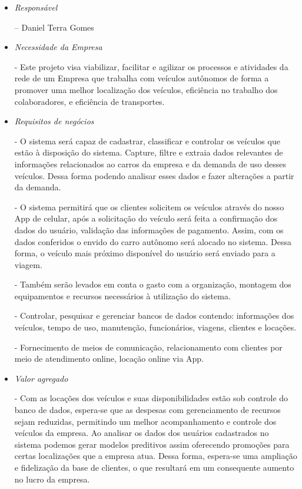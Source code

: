 \begin{itemize}

      \item \textit{Responsável}

            – Daniel Terra Gomes

      \item \textit{Necessidade da Empresa }

            - Este projeto visa viabilizar, facilitar e agilizar os processos e atividades da rede de um Empresa que trabalha com veículos autônomos de forma a promover uma melhor localização dos veículos, eficiência no trabalho dos colaboradores, e eficiência de transportes.

      \item \textit{Requisitos
                  de negócios}


            - O sistema será capaz de cadastrar, classificar e controlar os veículos que estão à disposição do sistema. Capture, filtre e extraia dados relevantes de informações relacionados ao carros da empresa e da demanda de uso desses veículos. Dessa forma podendo analisar esses dados e fazer alterações a partir da demanda.

            - O sistema permitirá que os clientes solicitem os veículos através do nosso App de celular, após a solicitação do veículo será feita a confirmação dos dados do usuário, validação das informações de pagamento. Assim, com os dados conferidos o envido do carro autônomo será alocado no sistema. Dessa forma, o veículo mais próximo disponível do usuário será enviado para a viagem.

            - Também serão levados em conta o gasto com a organização, montagem dos equipamentos e recursos necessários à utilização do sistema.

            - Controlar, pesquisar e gerenciar bancos de dados contendo: informações dos veículos, tempo de uso, manutenção, funcionários, viagens, clientes e locações.

            - Fornecimento de meios de comunicação, relacionamento com clientes por meio de atendimento online, locação online via App.


      \item \textit{Valor
                  agregado}

            - Com as locações dos veículos e suas disponibilidades estão sob controle do banco de dados, espera-se que as despesas com gerenciamento de recursos sejam reduzidas, permitindo um melhor acompanhamento e controle dos veículos da empresa. Ao analisar os dados dos usuários cadastrados no sistema podemos gerar modelos preditivos assim oferecendo promoções para certas localizações que a empresa atua. Dessa forma, espera-se uma ampliação e fidelização da base de clientes, o que resultará em um consequente aumento no lucro da empresa.


\end{itemize}
